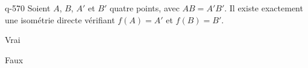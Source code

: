 \begin{truefalse}{q-570}
Soient $A$, $B$, $A'$ et $B'$  quatre points, avec $AB=A'B'$. Il existe exactement une isométrie directe vérifiant $f(A)=A'$ et $f(B)=B'$.
\item Vrai
\item* Faux
\end{truefalse}

